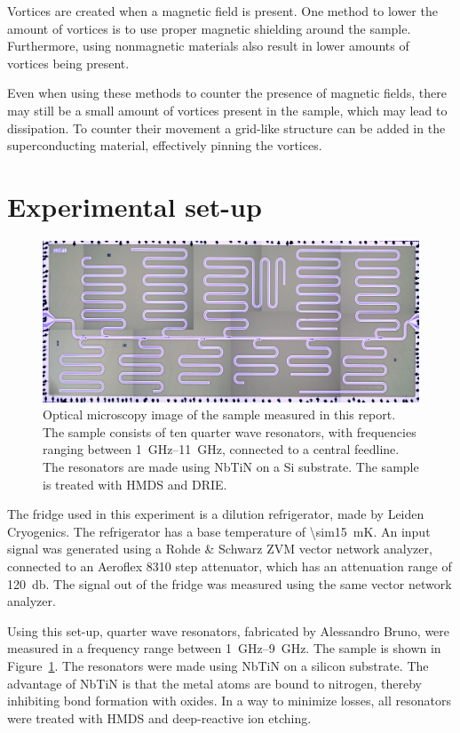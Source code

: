 \documentclass[12pt]{report}
\begin{document}
Vortices are created when a magnetic field is present. One method to lower the amount of vortices is to use proper magnetic shielding around the sample. Furthermore, using nonmagnetic materials also result in lower amounts of vortices being present.

Even when using these methods to counter the presence of magnetic fields, there may still be a small amount of vortices present in the sample, which may lead to dissipation. To counter their movement a grid-like structure can be added in the superconducting material, effectively pinning the vortices.



\section{Experimental set-up}


\begin{figure}
    \begin{center}
        \includegraphics[width = .4\textwidth]{Figures/All_set4.png}
    \end{center}
    \caption{Optical microscopy image of the sample measured in this report. The sample consists of ten quarter wave resonators, with frequencies ranging between \SIrange{1}{11}{\giga \hertz}, connected to a central feedline. The resonators are made using NbTiN on a Si substrate. The sample is treated with HMDS and DRIE.}
    \label{fig:set4}
\end{figure}

The fridge used in this experiment is a dilution refrigerator, made by Leiden Cryogenics. The refrigerator has a base temperature of \SI{\sim15}{\milli \kelvin}. An input signal was generated using a Rohde \& Schwarz ZVM vector network analyzer, connected to an Aeroflex 8310 step attenuator, which has an attenuation range of \SI{120}{\decibel}. The signal out of the fridge was measured using the same vector network analyzer.

Using this set-up, quarter wave resonators, fabricated by Alessandro Bruno, were measured in a frequency range between \SIrange{1}{9}{\giga \hertz}. The sample is shown in Figure~\ref{fig:set4}. The resonators were made using NbTiN on a silicon substrate. The advantage of NbTiN is that the metal atoms are bound to nitrogen, thereby inhibiting bond formation with oxides. In a way to minimize losses, all resonators were treated with HMDS and deep-reactive ion etching.
\end{document}
